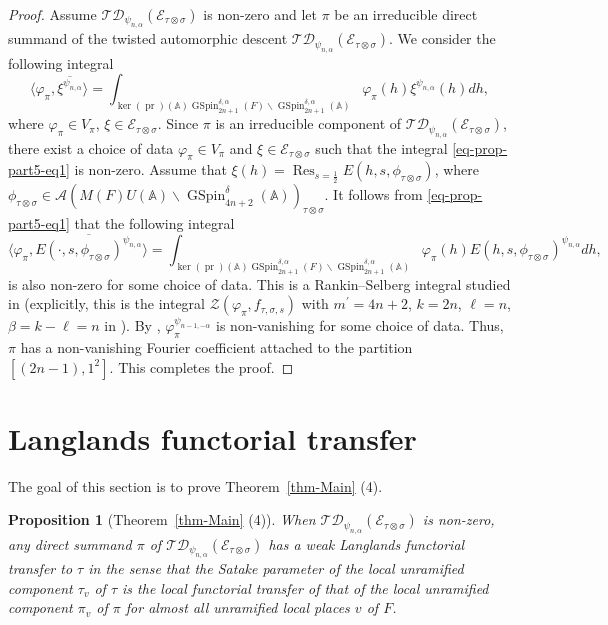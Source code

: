 \documentclass[12pt]{amsart}
\newcommand{\A}{\mathbb{A}}
\newcommand{\Res}{\operatorname{Res}}
\newcommand{\TD}{\mathcal{TD}}
\newcommand{\CE}{{\mathcal{E}}}
\newtheorem{proposition}[theorem]{Proposition}%
\theoremstyle{remark}
\newcommand{\pr}{\operatorname{pr}}
\DeclareMathOperator{\GSpin}{GSpin}
\newcommand{\bs}{\backslash}
\begin{document}
\begin{proof}
Assume $\TD_{\psi_{n,\alpha}}(\CE_{\tau\otimes\sigma})$ is non-zero and let $\pi$ be an irreducible direct summand of the twisted automorphic descent $\TD_{\psi_{n,\alpha}}(\CE_{\tau\otimes\sigma})$.  We consider the following integral
\begin{equation}
\label{eq-prop-part5-eq1}
\langle \varphi_\pi, \overline{\xi^{\psi_{n,\alpha}}} \rangle=\int_{\ker(\pr)(\A) \GSpin_{2n+1}^{\delta,\alpha}(F)\backslash \GSpin_{2n+1}^{\delta,\alpha}(\A)} \varphi_\pi(h) \xi^{\psi_{n,\alpha}}(h)dh, 	
\end{equation}
where $\varphi_\pi\in V_\pi$, $\xi\in \CE_{\tau\otimes\sigma}$. Since $\pi$ is an irreducible component of $\TD_{\psi_{n,\alpha}}(\CE_{\tau\otimes\sigma})$, there exist a choice of data $\varphi_\pi\in V_\pi$ and  $\xi\in \CE_{\tau\otimes\sigma}$ such that the integral \eqref{eq-prop-part5-eq1} is non-zero.
Assume that $\xi(h)=\Res_{s=\frac{1}{2}}E(h, s, \phi_{\tau\otimes\sigma})$, where $\phi_{\tau\otimes\sigma}\in \mathcal{A}(M(F)U(\A)\bs \GSpin_{4n+2}^\delta(\A))_{\tau\otimes \sigma}$. It follows from \eqref{eq-prop-part5-eq1} that the following integral 
\begin{equation}
\label{eq-prop-part5-eq2}
\langle \varphi_\pi, \overline{E(\cdot, s, \phi_{\tau\otimes\sigma})^{\psi_{n,\alpha}}} \rangle=\int_{\ker(\pr)(\A) \GSpin_{2n+1}^{\delta,\alpha}(F)\backslash \GSpin_{2n+1}^{\delta,\alpha}(\A)} \varphi_\pi(h) E(h, s, \phi_{\tau\otimes\sigma})^{\psi_{n,\alpha}}dh, 
\end{equation}
is also non-zero for some choice of data. This is a Rankin--Selberg integral studied in \cite{Yan2025GGP} (explicitly, this is the integral $\mathcal{Z}(\varphi_\pi,f_{\tau,\sigma,s})$ with $m^\prime=4n+2$, $k=2n$, $\ell=n$, $\beta=k-\ell=n$ in \cite{Yan2025GGP}). By \cite[Corollary 3.16]{Yan2025GGP}, $\varphi_\pi^{\psi_{n-1,-\alpha}}$ is non-vanishing for some choice of data. Thus, $\pi$ has a non-vanishing Fourier coefficient attached to the partition $[(2n-1),1^2]$. This completes the proof. 
\end{proof}

\section{Langlands functorial transfer}
\label{section-functorial}

The goal of this section is to prove Theorem~\ref{thm-Main} (4).  

\begin{proposition}[Theorem~\ref{thm-Main} (4)]
\label{prop-part4}
When $\TD_{\psi_{n,\alpha}}(\CE_{\tau\otimes\sigma})$ is non-zero, any direct summand $\pi$ of $\TD_{\psi_{n,\alpha}}(\CE_{\tau\otimes\sigma})$ has a weak Langlands functorial transfer to $\tau$ in the sense that the Satake parameter of the local unramified component $\tau_v$ of $\tau$ is the local functorial transfer of that of the local unramified component $\pi_v$ of $\pi$ for almost all unramified local places $v$ of $F$.
\end{proposition}
\end{document}
